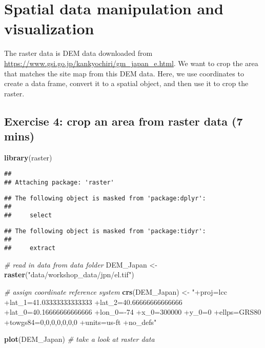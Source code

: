 \documentclass[
  xelatex,ja=standard]{bxjsarticle}
\newenvironment{Shaded}{\begin{snugshade}}{\end{snugshade}}
\newcommand{\CommentTok}[1]{\textcolor[rgb]{0.56,0.35,0.01}{\textit{#1}}}
\newcommand{\KeywordTok}[1]{\textcolor[rgb]{0.13,0.29,0.53}{\textbf{#1}}}
\newcommand{\NormalTok}[1]{#1}
\newcommand{\StringTok}[1]{\textcolor[rgb]{0.31,0.60,0.02}{#1}}
\begin{document}
\hypertarget{spatial-data-manipulation-and-visualization}{%
\section{Spatial data manipulation and
visualization}\label{spatial-data-manipulation-and-visualization}}

The raster data is DEM data downloaded from
\url{https://www.gsi.go.jp/kankyochiri/gm_japan_e.html}. We want to crop
the area that matches the site map from this DEM data. Here, we use
coordinates to create a data frame, convert it to a spatial object, and
then use it to crop the raster.

\hypertarget{exercise-4-crop-an-area-from-raster-data-7-mins}{%
\subsection{Exercise 4: crop an area from raster data (7
mins)}\label{exercise-4-crop-an-area-from-raster-data-7-mins}}

\begin{Shaded}
\begin{Highlighting}[]
\KeywordTok{library}\NormalTok{(raster)}
\end{Highlighting}
\end{Shaded}

\begin{verbatim}
## 
## Attaching package: 'raster'
\end{verbatim}

\begin{verbatim}
## The following object is masked from 'package:dplyr':
## 
##     select
\end{verbatim}

\begin{verbatim}
## The following object is masked from 'package:tidyr':
## 
##     extract
\end{verbatim}

\begin{Shaded}
\begin{Highlighting}[]
\CommentTok{# read in data from data folder}
\NormalTok{DEM_Japan <-}\StringTok{ }\KeywordTok{raster}\NormalTok{(}\StringTok{"data/workshop_data/jpn/el.tif"}\NormalTok{)}

\CommentTok{# assign coordinate reference system}
\KeywordTok{crs}\NormalTok{(DEM_Japan) <-}\StringTok{ "+proj=lcc +lat_1=41.03333333333333 +lat_2=40.66666666666666 +lat_0=40.16666666666666 +lon_0=-74 +x_0=300000 +y_0=0 +ellps=GRS80 +towgs84=0,0,0,0,0,0,0 +units=us-ft +no_defs"}

\KeywordTok{plot}\NormalTok{(DEM_Japan) }\CommentTok{# take a look at raster data}
\end{Highlighting}
\end{Shaded}
\end{document}
